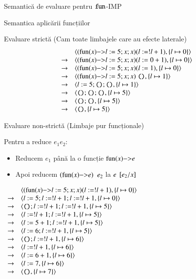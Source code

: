 \documentclass[xcolor=pdftex,romanian,colorlinks]{beamer}
\begin{document}
\begin{section}{Semantică de evaluare pentru $\mathrel{\text{\ttfamily fun}}$-IMP}
\begin{subsection}{Semantica aplicării funcțiilor}
\begin{frame}{Evaluare strictă (Cam toate limbajele care au efecte laterale)}
\[\begin{array}{ll}
& \c{(\fun{x}{l := 5 ; x ; x}) (l := !l + 1), \{l \mapsto 0\}} \\
\rightarrow& \c{(\fun{x}{l := 5 ; x ; x}) (l := 0 + 1), \{l \mapsto 0\}} \\
\rightarrow& \c{(\fun{x}{l := 5 ; x ; x}) (l := 1), \{l \mapsto 0\}} \\
\rightarrow& \c{(\fun{x}{l := 5 ; x ; x}) \Sskip, \{l \mapsto 1\}} \\
\rightarrow& \c{l := 5 ; \Sskip ; \Sskip, \{l \mapsto 1\}} \\
\rightarrow& \c{\Sskip ; \Sskip ; \Sskip, \{l \mapsto 5\}} \\
\rightarrow& \c{\Sskip ; \Sskip, \{l \mapsto 5\}} \\
\rightarrow& \c{\Sskip, \{l \mapsto 5\}} \\
\end{array}\]

\end{frame}


\begin{frame}{Evaluare non-strictă (Limbaje pur funcționale)} 
\begin{block}{}
Pentru a reduce $e_1 \mathrel{} e_2$:
\begin{itemize}
\item  Reducem $e_1$ până la o funcție $\fun{x}{e}$
\item Apoi reducem $(\fun{x}{e}) \mathrel{}e_2$ la $e\mathbin{}[e_2/x]$
\end{itemize}
\end{block}

\hfill $\begin{array}{ll}
& \c{(\fun{x}{l := 5 ; x ; x}) (l := !l + 1), \{l \mapsto 0\}} \\
\rightarrow& \c{l := 5 ; l := !l + 1 ; l := !l + 1, \{l \mapsto 0\}} \\
\rightarrow& \c{\Sskip ; l := !l + 1 ; l := !l + 1, \{l \mapsto 5\}} \\
\rightarrow& \c{l := !l + 1 ; l := !l + 1, \{l \mapsto 5\}} \\
\rightarrow& \c{l := 5 + 1 ; l := !l + 1, \{l \mapsto 5\}} \\
\rightarrow& \c{l := 6 ; l := !l + 1, \{l \mapsto 5\}} \\
\rightarrow& \c{\Sskip ; l := !l + 1, \{l \mapsto 6\}} \\
\rightarrow& \c{l := !l + 1, \{l \mapsto 6\}} \\
\rightarrow& \c{l := 6 + 1, \{l \mapsto 6\}} \\
\rightarrow& \c{l := 7, \{l \mapsto 6\}} \\
\rightarrow& \c{\Sskip, \{l \mapsto 7\}}
\end{array}$ \hfill\;


\end{frame}
\end{subsection}
\end{section}
\end{document}
